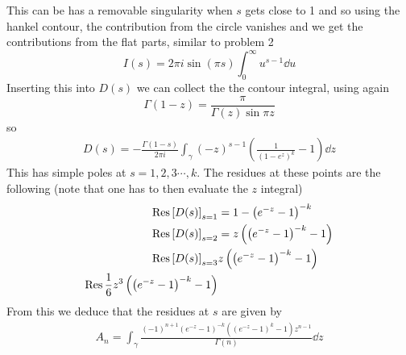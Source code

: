 \documentclass[a4paper,12pt]{article}
\begin{document}
This can be has a removable singularity when $s$ gets close to 1 and so using the hankel contour, the contribution from the circle vanishes and we get the contributions from the flat parts, similar to problem 2
\begin{equation}
I(s)=2\pi i\sin(\pi s)\int_{0}^{\infty}u^{s-1}	\dd u
\end{equation}
Inserting this into $D(s)$ we can collect the the contour integral, using again
\begin{equation}
	\Gamma(1-z)=\frac{\pi}{\Gamma(z)\sin \pi z}
\end{equation}
so 
\begin{equation}
	\begin{aligned}
D(s)=-\frac{\Gamma(1-s)}{2\pi i}\int_\gamma
 (-z)^{s-1}\left(\frac{1}{(1-e^{z})^{k}}-1\right) \dd z
	\end{aligned}
\end{equation}
This has simple poles at $s=1,2,3\cdots,k$. The residues at these points are the following (note that one has to then evaluate the $z$ integral)
\begin{equation}
	\begin{aligned}
		\Res \left[D(s)\right]_{s=1}&=1-\left(e^{-z}-1\right)^{-k}\\
		\Res \left[D(s)\right]_{s=2}&=z \left(\left(e^{-z}-1\right)^{-k}-1\right)\\
		\Res \left[D(s)\right]_{s=3}&z \left(\left(e^{-z}-1\right)^{-k}-1\right)\\
		\Res \frac{1}{6} z^3 \left(\left(e^{-z}-1\right)^{-k}-1\right)
	\end{aligned}
\end{equation}
From this we deduce that the residues at $s$ are given by
\begin{equation}
	\begin{aligned}
		A_n=\int_\gamma
		\frac{(-1)^{n+1} \left(e^{-z}-1\right)^{-k} \left(\left(e^{-z}-1\right)^k-1\right) z^{n-1}}{\Gamma (n)}
		\dd z
	\end{aligned}
\end{equation}
\end{document}
